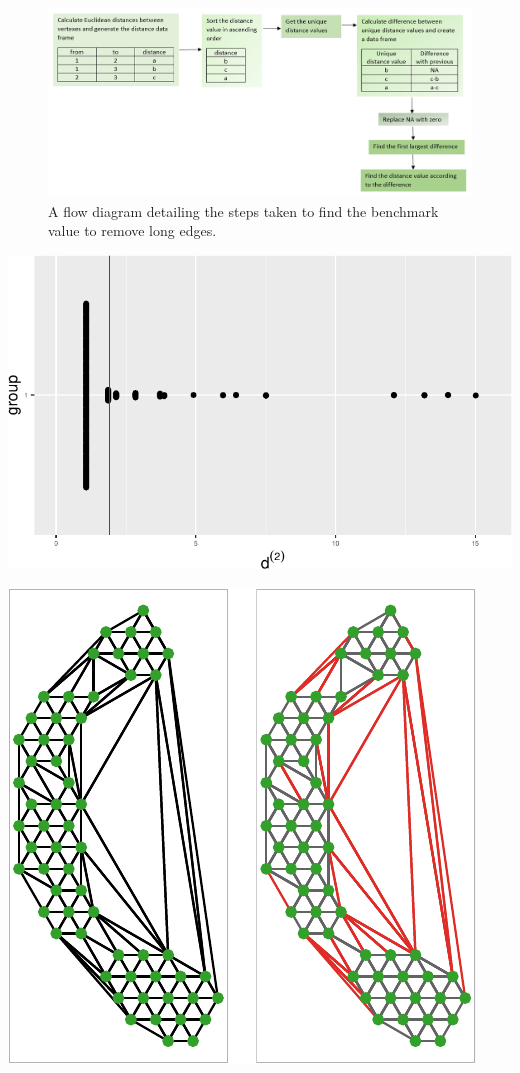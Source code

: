 \documentclass[
  12pt]{article}
\begin{document}
\begin{figure}

{\centering \includegraphics[width=1\textwidth,height=1\textheight]{figures/remove_long_edges_workflow.png}

}

\caption{\label{fig-rmlgmeth}A flow diagram detailing the steps taken to
find the benchmark value to remove long edges.}

\end{figure}

\includegraphics{appendix_files/figure-pdf/unnamed-chunk-16-1.pdf}

\includegraphics{appendix_files/figure-pdf/unnamed-chunk-17-1.pdf}
\end{document}

